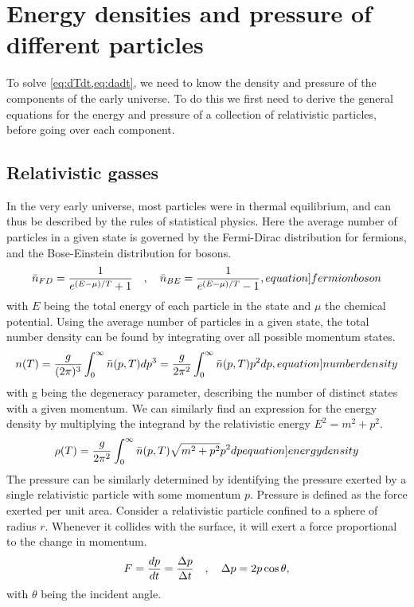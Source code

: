 

\section{Energy densities and pressure of different particles}
To solve \cref{eq:dTdt,eq:dadt}, we need to know the density and pressure of the components of the early universe. To do this we first need to derive the general equations for the energy and pressure of a collection of relativistic particles, before going over each component.

\subsection{Relativistic gasses}
In the very early universe, most particles were in thermal equilibrium, and can thus be described by the rules of statistical physics. Here the average number of particles in a given state is governed by the Fermi-Dirac distribution for fermions, and the Bose-Einstein distribution for bosons.
\begin{align}
    \bar{n}_{FD}=\frac{1}{e^{(E-\mu)/T}+1} \eqsep   \bar{n}_{BE}=\frac{1}{e^{(E-\mu)/T}-1},
    \label[equation]{fermionboson}
\end{align}
with $E$ being the total energy of each particle in the state and $\mu$ the chemical potential. Using the average number of particles in a given state, the total number density can be found by integrating over all possible momentum states. 
\begin{align}
    n(T)=\frac{g}{(2\pi)^3}\int_{0}^{\infty}\bar{n}(p,T)dp^3=\frac{g}{2\pi^2}\int_{0}^{\infty}\bar{n}(p,T) p^2 dp,
    \label[equation]{numberdensity}
\end{align}
with g being the degeneracy parameter, describing the number of distinct states with a given momentum. We can similarly find an expression for the energy density by multiplying the integrand by the relativistic energy $E^2=m^2+p^2$.
\begin{align}
    \rho(T)=\frac{g}{2\pi^2}\int_{0}^{\infty}\bar{n}(p,T)\sqrt{m^2+p^2} p^2 dp
    \label[equation]{energydensity}
\end{align}
The pressure can be similarly determined by identifying the pressure exerted by a single relativistic particle with some momentum $p$.
Pressure is defined as the force exerted per unit area. Consider a relativistic particle confined to a sphere of radius $r$. Whenever it collides with the surface, it will exert a force proportional to the change in momentum. 
\begin{align}
    F=\frac{dp}{dt}=\frac{\Delta p }{\Delta t}\quad , \quad
    \Delta p = 2p \cos \theta,
    \label{eq:pressureF}
\end{align}
with $\theta$ being the incident angle. 

